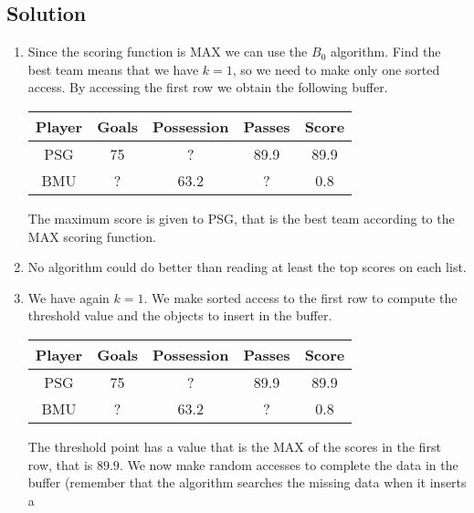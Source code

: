 \subsection*{Solution}
\begin{enumerate}
    \item Since the scoring function is MAX we can use the $B_0$ algorithm. Find the best team means that we have $k=1$, so we 
        need to make only one sorted access. By accessing the first row we obtain the following buffer. 
        \begin{table}[H]
            \centering
            \begin{tabular}{c|ccc|c}
            \hline
            \textbf{Player} & \textbf{Goals} & \textbf{Possession} & \textbf{Passes} & \textbf{Score} \\ \hline
            PSG             & 75             & ?                   & 89.9            & 89.9           \\
            BMU             & ?              & 63.2                & ?               & 0.8            \\ \hline
            \end{tabular}
        \end{table}
        The maximum score is given to PSG, that is the best team according to the MAX scoring function. 
    \item No algorithm could do better than reading at least the top scores on each list. 
    \item We have again $k=1$. We make sorted access to the first row to compute the threshold value and 
        the objects to insert in the buffer. 
        \begin{table}[H]
            \centering
            \begin{tabular}{c|ccc|c}
            \hline
            \textbf{Player} & \textbf{Goals} & \textbf{Possession} & \textbf{Passes} & \textbf{Score} \\ \hline
            PSG             & 75             & ?                   & 89.9            & 89.9           \\
            BMU             & ?              & 63.2                & ?               & 0.8            \\ \hline
            \end{tabular}
        \end{table}
        The threshold point has a value that is the MAX of the scores in the first row, that is $89.9$. We now make random 
        accesses to complete the data in the buffer (remember that the algorithm searches the missing data when it inserts a 

\end{enumerate}
